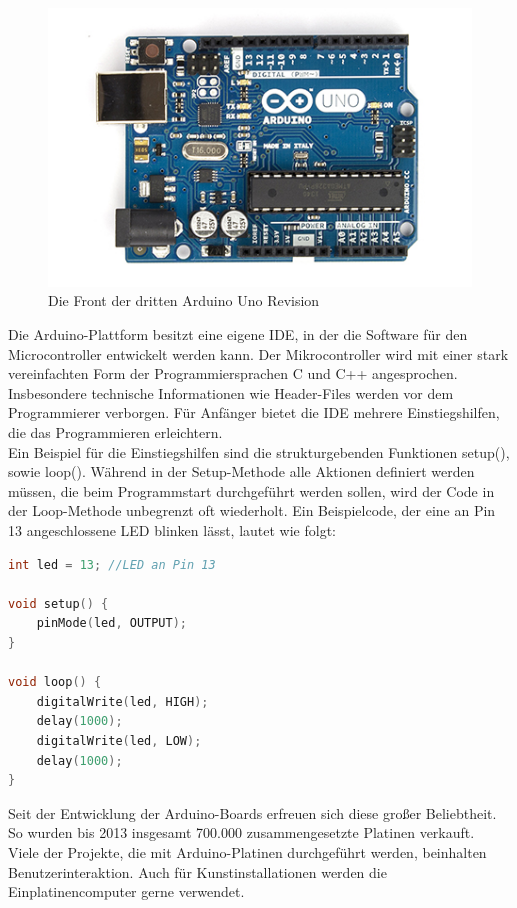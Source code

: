 \begin{figure}[H] 
	\centering
	\includegraphics[scale=0.6]{Bilder/arduinouno}
	\caption{Die Front der dritten Arduino Uno Revision\cite{i:arduinouno}}
	\label{f:tree}
\end{figure}

Die Arduino-Plattform besitzt eine eigene \ac{IDE}, in der die Software für den Microcontroller entwickelt werden kann. Der Mikrocontroller wird mit einer stark vereinfachten Form der Programmiersprachen C und C++ angesprochen. Insbesondere technische Informationen wie Header-Files werden vor dem Programmierer verborgen. Für Anfänger bietet die \ac{IDE} mehrere Einstiegshilfen, die das Programmieren erleichtern.\\
Ein Beispiel für die Einstiegshilfen sind die strukturgebenden Funktionen setup(), sowie loop(). Während in der Setup-Methode alle Aktionen definiert werden müssen, die beim Programmstart durchgeführt werden sollen, wird der Code in der Loop-Methode unbegrenzt oft wiederholt.
Ein Beispielcode, der eine an Pin 13 angeschlossene LED blinken lässt, lautet wie folgt:\\

\begin{lstlisting}[language=c,caption={Simpler Arduino-Code, der eine LED blinken lässt},label=lst:blink,frame=single] 
int led = 13; //LED an Pin 13

void setup() {                
	pinMode(led, OUTPUT);     
}

void loop() {
	digitalWrite(led, HIGH);  
	delay(1000);               
	digitalWrite(led, LOW);   
	delay(1000);               
}
\end{lstlisting}

\vspace{1cm}

Seit der Entwicklung der Arduino-Boards erfreuen sich diese großer Beliebtheit. So wurden bis 2013 insgesamt 700.000 zusammengesetzte Platinen verkauft\cite{ws:sellnumb}.\\

Viele der Projekte, die mit Arduino-Platinen durchgeführt werden, beinhalten Benutzerinteraktion. Auch für Kunstinstallationen werden die Einplatinencomputer gerne verwendet\cite{ws:elektor}.
